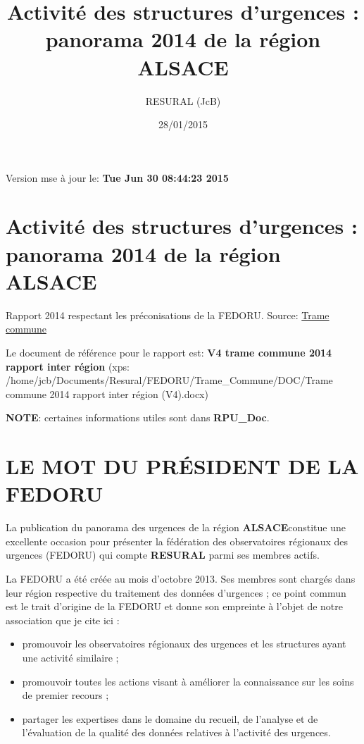 \documentclass[]{article}
\title{Activité des structures d'urgences : panorama 2014 de la région ALSACE}
\author{RESURAL (JcB)}
\date{28/01/2015}
\begin{document}
\maketitle


{
\hypersetup{linkcolor=black}
\setcounter{tocdepth}{2}
\tableofcontents
}
Version mse à jour le: \textbf{Tue Jun 30 08:44:23 2015}

\section{Activité des structures d'urgences : panorama 2014 de la région
ALSACE}\label{activite-des-structures-durgences-panorama-2014-de-la-region-alsace}

Rapport 2014 respectant les préconisations de la FEDORU. Source:
\href{https://docs.google.com/document/d/101LYVqVLeHZnrujfMm3aqBYfbOwx3CPEB3Y-Lbud2Ls/edit}{Trame
commune}

Le document de référence pour le rapport est: \textbf{V4 trame commune
2014 rapport inter région} (xps:
/home/jcb/Documents/Resural/FEDORU/Trame\_Commune/DOC/Trame commune 2014
rapport inter région (V4).docx)

\textbf{NOTE}: certaines informations utiles sont dans
\textbf{RPU\_Doc}.

\section{LE MOT DU PRÉSIDENT DE LA
FEDORU}\label{le-mot-du-president-de-la-fedoru}

La publication du panorama des urgences de la région
\textbf{ALSACE}constitue une excellente occasion pour présenter la
fédération des observatoires régionaux des urgences (FEDORU) qui compte
\textbf{RESURAL} parmi ses membres actifs.

La FEDORU a été créée au mois d'octobre 2013. Ses membres sont chargés
dans leur région respective du traitement des données d'urgences ; ce
point commun est le trait d'origine de la FEDORU et donne son empreinte
à l'objet de notre association que je cite ici :

\begin{itemize}
\itemsep1pt\parskip0pt
\item
  promouvoir les observatoires régionaux des urgences et les structures
  ayant une activité similaire ;
\item
  promouvoir toutes les actions visant à améliorer la connaissance sur
  les soins de premier recours ;
\item
  partager les expertises dans le domaine du recueil, de l'analyse et de
  l'évaluation de la qualité des données relatives à l'activité des
  urgences.
\end{itemize}
\end{document}
